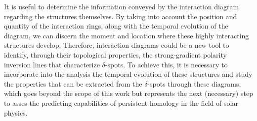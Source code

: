 It is useful to determine the information conveyed by the interaction diagram regarding the structures themselves. By taking into account the position and quantity of the interaction rings, along with the temporal evolution of the diagram, we can discern the moment and location where these highly interacting structures develop. Therefore, interaction diagrams could be a new tool to identify, through their topological properties, the strong-gradient polarity inversion lines that characterize $\delta$-spots. To achieve this, it is necessary to incorporate into the analysis the temporal evolution of these structures and study the properties that can be extracted from the $\delta$-spots through these diagrams, which goes beyond the scope of this work but represents the next (necessary) step to asses the predicting capabilities of persistent homology in the field of solar physics.


